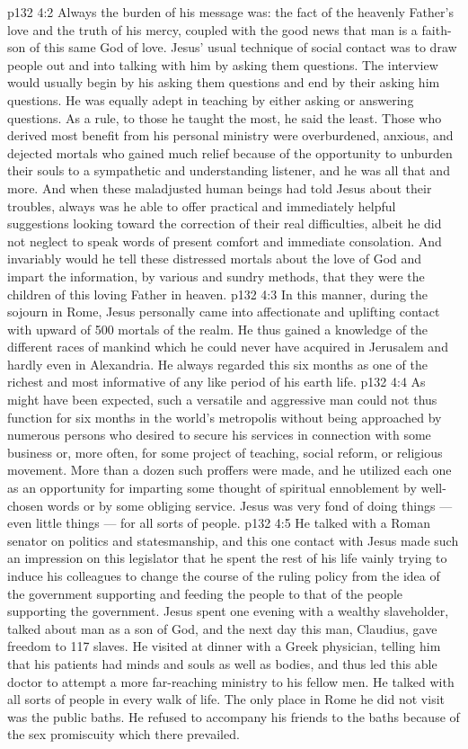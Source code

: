 \vs p132 4:2 Always the burden of his message was: the fact of the heavenly Father’s love and the truth of his mercy, coupled with the good news that man is a faith\hyp{}son of this same God of love. Jesus’ usual technique of social contact was to draw people out and into talking with him by asking them questions. The interview would usually begin by his asking them questions and end by their asking him questions. He was equally adept in teaching by either asking or answering questions. As a rule, to those he taught the most, he said the least. Those who derived most benefit from his personal ministry were overburdened, anxious, and dejected mortals who gained much relief because of the opportunity to unburden their souls to a sympathetic and understanding listener, and he was all that and more. And when these maladjusted human beings had told Jesus about their troubles, always was he able to offer practical and immediately helpful suggestions looking toward the correction of their real difficulties, albeit he did not neglect to speak words of present comfort and immediate consolation. And invariably would he tell these distressed mortals about the love of God and impart the information, by various and sundry methods, that they were the children of this loving Father in heaven.
\vs p132 4:3 In this manner, during the sojourn in Rome, Jesus personally came into affectionate and uplifting contact with upward of 500 mortals of the realm. He thus gained a knowledge of the different races of mankind which he could never have acquired in Jerusalem and hardly even in Alexandria. He always regarded this six months as one of the richest and most informative of any like period of his earth life.
\vs p132 4:4 As might have been expected, such a versatile and aggressive man could not thus function for six months in the world’s metropolis without being approached by numerous persons who desired to secure his services in connection with some business or, more often, for some project of teaching, social reform, or religious movement. More than a dozen such proffers were made, and he utilized each one as an opportunity for imparting some thought of spiritual ennoblement by well\hyp{}chosen words or by some obliging service. Jesus was very fond of doing things --- even little things --- for all sorts of people.
\vs p132 4:5 \pc He talked with a Roman senator on politics and statesmanship, and this one contact with Jesus made such an impression on this legislator that he spent the rest of his life vainly trying to induce his colleagues to change the course of the ruling policy from the idea of the government supporting and feeding the people to that of the people supporting the government. Jesus spent one evening with a wealthy slaveholder, talked about man as a son of God, and the next day this man, Claudius, gave freedom to 117 slaves. He visited at dinner with a Greek physician, telling him that his patients had minds and souls as well as bodies, and thus led this able doctor to attempt a more far\hyp{}reaching ministry to his fellow men. He talked with all sorts of people in every walk of life. The only place in Rome he did not visit was the public baths. He refused to accompany his friends to the baths because of the sex promiscuity which there prevailed.
